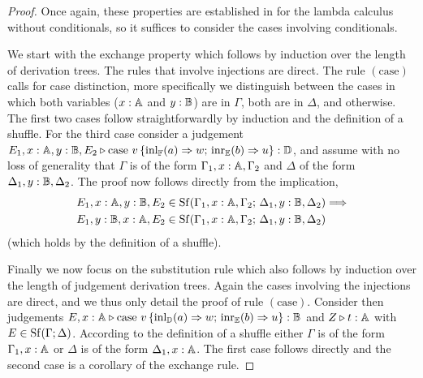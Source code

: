 \begin{proof}
  Once again, these properties are established in \cite[Theorem 2.1]{dahlqvist2023syntactic} for the lambda calculus without conditionals, so it suffices to consider the cases involving conditionals.

  We start with the exchange property which follows by induction over the length
of derivation trees. The rules that involve injections are direct.  The rule
$(\text{case})$ calls for case distinction, more specifically we  distinguish
between the cases in which both variables ($x : \mathbb{A}$ and $y : \mathbb{B}$) are
in $\Gamma$, both are in $\Delta$, and otherwise. The first two cases follow
straightforwardly by induction and the definition of a shuffle. For the third
case consider a judgement $E_1,x : \mathbb{A}, y : \mathbb{B}, E_2 \triangleright \text{case }
v\, \{\mathrm{inl}_{\mathbb{F}}(a) \Rightarrow w ; \, \mathrm{inr}_{\mathbb{E}}(b) \Rightarrow u \}:
\mathbb{D}$, and assume with no loss of generality that $\Gamma$ is of the form
$\Gamma_1, x : \mathbb{A}, \Gamma_2$ and $\Delta$ of the form $\Delta_1, y :
\mathbb{B}, \Delta_2$. The proof now follows directly from the implication,
\begin{align*}
        & E_1, x : \mathbb{A}, y : \mathbb{B}, E_2 \in \mathrm{Sf}(\Gamma_1, x : \mathbb{A}, \Gamma_2 ; \,
        \Delta_1, y : \mathbb{B}, \Delta_2) \Longrightarrow  \\
        &
        E_1, y : \mathbb{B}, x : \mathbb{A}, E_2 \in \mathrm{Sf}(\Gamma_1, x : \mathbb{A}, \Gamma_2 ; \,
        \Delta_1, y : \mathbb{B}, \Delta_2)
\end{align*}
(which holds by the definition of a shuffle).

Finally we now focus on the substitution rule which also follows by induction over the
length of judgement derivation trees. Again the cases involving the injections are direct,
and we thus only detail the proof of rule $(\text{case})$. Consider then
judgements $E,x : \mathbb{A} \triangleright \text{case } v\, \{\mathrm{inl}_{\mathbb{D}}(a) \Rightarrow
w ; \, \mathrm{inr}_{\mathbb{E}}(b) \Rightarrow u \}: \mathbb{B}$ and
$Z \triangleright t : \mathbb{A}$ with $E \in \mathrm{Sf}(\Gamma; \Delta)$. According to the definition
of a shuffle either $\Gamma$ is of the form $\Gamma_1, x: \mathbb{A}$ or $\Delta$ is
of the form $\Delta_1, x : \mathbb{A}$. The first case follows directly and the second case
is a corollary of the exchange rule.
\end{proof}
 


